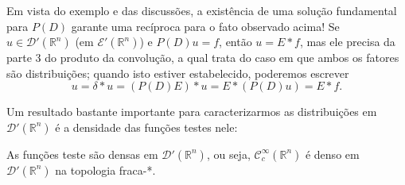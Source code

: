 \documentclass[../distribution_theory_notes.tex]{subfiles}
\begin{document}
Em vista do exemplo e das discussões, a existência de uma solução fundamental para \(P(D)\) garante uma recíproca para o fato observado acima! Se \(u\in \mathcal{D}'(\mathbb{R}^{n})\) (em \(\mathcal{E}'(\mathbb{R}^{n})\)) e \(P(D)u = f\), então \(u=E*f\), mas ele precisa da parte 3 do produto da convolução, a qual trata do caso
em que ambos os fatores são distribuições; quando isto estiver estabelecido, poderemos escrever
\[
	u = \delta *u = (P(D)E)*u = E*(P(D)u)=E*f.
\]

Um resultado bastante importante para caracterizarmos as distribuições em \(\mathcal{D}'(\mathbb{R}^{n})\) é a densidade das funções testes nele:
\begin{theorem*}
	As funções teste são densas em \(\mathcal{D}'(\mathbb{R}^{n})\), ou seja, \(\mathcal{C}_{c}^{\infty}(\mathbb{R}^{n})\) é denso em \(\mathcal{D}'(\mathbb{R}^{n})\) na topologia fraca-*.
\end{theorem*}
\end{document}
